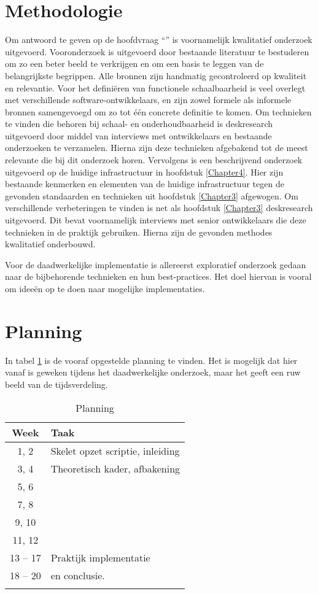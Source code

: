 \section{Methodologie}
Om antwoord te geven op de hoofdvraag \enquote{\hoofdvraagname} is voornamelijk kwalitatief onderzoek uitgevoerd. Vooronderzoek is uitgevoerd door bestaande literatuur te bestuderen om zo een beter beeld te verkrijgen en om een basis te leggen van de belangrijkste begrippen. Alle bronnen zijn handmatig gecontroleerd op kwaliteit en relevantie. Voor het definiëren van functionele schaalbaarheid is veel overlegt met verschillende software-ontwikkelaars, en zijn zowel formele als informele bronnen samengevoegd om zo tot één concrete definitie te komen. Om technieken te vinden die behoren bij schaal- en onderhoudbaarheid is deskresearch uitgevoerd door middel van interviews met ontwikkelaars en bestaande onderzoeken te verzamelen. Hierna zijn deze technieken afgebakend tot de meest relevante die bij dit onderzoek horen. Vervolgens is een beschrijvend onderzoek uitgevoerd op de huidige infrastructuur in hoofdstuk \ref{Chapter4}. Hier zijn bestaande kenmerken en elementen van de huidige infrastructuur tegen de gevonden standaarden en technieken uit hoofdstuk \ref{Chapter3} afgewogen. Om verschillende verbeteringen te vinden is net als hoofdstuk \ref{Chapter3} deskresearch uitgevoerd. Dit bevat voornamelijk interviews met senior ontwikkelaars die deze technieken in de praktijk gebruiken. Hierna zijn de gevonden methodes kwalitatief onderbouwd.

Voor de daadwerkelijke implementatie is allereerst exploratief onderzoek gedaan naar de bijbehorende technieken en hun best-practices. Het doel hiervan is vooral om ideeën op te doen naar mogelijke implementaties.

\section{Planning}
In tabel \ref{tab:planning} is de vooraf opgestelde planning te vinden. Het is mogelijk dat hier vanaf is geweken tijdens het daadwerkelijke onderzoek, maar het geeft een ruw beeld van de tijdsverdeling.

\begin{table}[h]
	\caption{Planning}
	\label{tab:planning}
	\centering
	\begin{tabular}{c p{12cm}}
		\toprule
		\textbf{Week} & \textbf{Taak}\\
		\midrule
			1, 2 & Skelet opzet scriptie, inleiding \\
			3, 4 & Theoretisch kader, afbakening \\
			5, 6 & \deeltechnieken \\
			7, 8 & \deelhuidig \\
			9, 10 & \deelverbetering \\
			11, 12 & \deelimplementatie \\
			13 -- 17 & Praktijk implementatie \\
			18 -- 20 & \deelrequirements en conclusie.\\
		\bottomrule\\
	\end{tabular}
\end{table}

